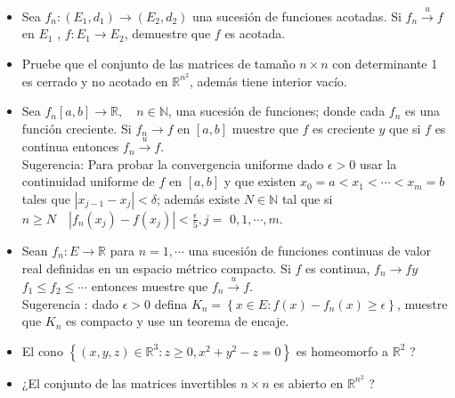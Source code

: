\begin{itemize}
\item Sea $f_n:\left(E_1, d_1\right) \rightarrow\left(E_2, d_2\right)$ una sucesión de funciones acotadas. Si $f_n \xrightarrow{u} f$ en $E_1$ , $f: E_1 \rightarrow E_2$, demuestre que $f$ es acotada.

\item Pruebe que el conjunto de las matrices de tamaño $n \times n$ con determinante 1 es cerrado y no acotado en $\mathbb{R}^{n^2}$, además tiene interior vacío.

\item Sea $f_n[a, b] \rightarrow \mathbb{R}, \quad n \in \mathbb{N}$, una sucesión de funciones; donde cada $f_n$ es una función creciente. Si $f_n \rightarrow f$ en $[a, b]$ muestre que $f$ es creciente $y$ que si $f$ es continua entonces $f_n \xrightarrow{u} f$.\\

Sugerencia: Para probar la convergencia uniforme dado $\epsilon>0$ usar la continuidad uniforme de $f$ en $[a, b]$ y que existen $x_0=a<x_1<\cdots<x_m=b$ tales que $\left|x_{j-1}-x_j\right|<\delta$; además existe $N \in \mathbb{N}$ tal que si $n \geq N \quad\left|f_n\left(x_j\right)-f\left(x_j\right)\right|<\frac{\epsilon}{5}, j=$ $0,1, \cdots, m$.

\item Sean $f_n: E \rightarrow \mathbb{R}$ para $n=1, \cdots$ una sucesión de funciones continuas de valor real definidas en un espacio métrico compacto. Si $f$ es continua, $f_n \rightarrow f y$ $f_1 \leq f_2 \leq \cdots$ entonces muestre que $f_n \xrightarrow{u} f$.\\

Sugerencia : dado $\epsilon>0$ defina $K_n=\left\{x \in E: f(x)-f_n(x) \geq \epsilon\right\}$, muestre que $K_n$ es compacto y use un teorema de encaje.

\item El cono $\left\{(x, y, z) \in \mathbb{R}^3: z \geq 0, x^2+y^2-z=0\right\}$ es homeomorfo a $\mathbb{R}^2$ ?

\item ¿El conjunto de las matrices invertibles $n \times n$ es abierto en $\mathbb{R}^{n^2}$ ?
\end{itemize}




